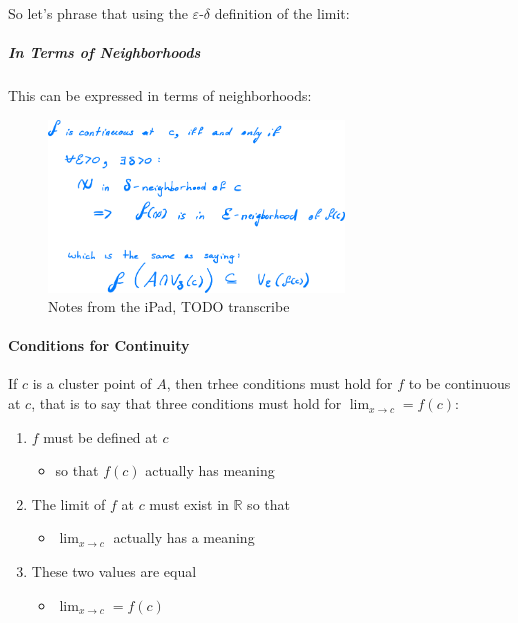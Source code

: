 \documentclass[class=article, crop=false]{standalone}
\begin{document}
So let's phrase that using the \(\varepsilon\)-\(\delta\) definition of
the limit: \\

\subparagraph{In Terms of Neighborhoods}

This can be expressed in terms of neighborhoods:
\begin{figure}
\includegraphics[width=0.7\textwidth]{media/Continuity/6d89890c4876af9738ff2bd73575f425a45c101a.png}
\caption{Notes from the iPad, TODO transcribe}
\end{figure}

\newpage
\hypertarget{header-n3893}{%
\paragraph{Conditions for Continuity}\label{header-n3893}}

If \(c\) is a cluster point of \(A\), then trhee conditions must hold
for \(f\) to be continuous at \(c\), that is to say that three
conditions must hold for \(\lim_{x\rightarrow c} = f(c)\):

\begin{enumerate}
\def\labelenumi{\arabic{enumi}.}
\item
  \(f\) must be defined at \(c\)

  \begin{itemize}
  \item
    so that \(f(c)\) actually has meaning
  \end{itemize}
\item
  The limit of \(f\) at \(c\) must exist in \(\mathbb{R}\) so that

  \begin{itemize}
  \item
    \(\lim_{x\rightarrow c}\) actually has a meaning
  \end{itemize}
\item
  These two values are equal

  \begin{itemize}
  \item
    \(\lim_{x\rightarrow c} = f(c)\)
  \end{itemize}
\end{enumerate}
\end{document}
